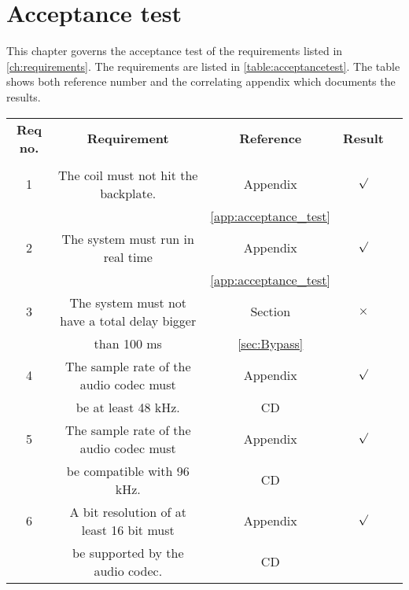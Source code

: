 \chapter{Acceptance test}

This chapter governs the acceptance test of the requirements listed in \autoref{ch:requirements}. The requirements are listed in \autoref{table:acceptancetest}. The table shows both reference number and the correlating appendix which documents the results.  

\renewcommand{\arraystretch}{0.95}
\begin{table}[H]
\centering
\begin{tabular}{|c|c|c|c|c|} \hline
\rowcolor{lightgray} \bfseries Req no. 	& \bfseries Requirement 						&  \bfseries Reference				&\bfseries Result 	\\ 
\rowcolor{lightgray}					&												&  									&		 			\\ \hline

1			& The coil must not hit the backplate. 			& Appendix 								&	$\surd$ 		\\ 
 			&												& \ref{app:acceptance_test}				&	 				\\ \hline
%
2			& The system must run in real time	 			& Appendix								& 	$\surd$			\\ 
			& 												& \ref{app:acceptance_test}				&					\\ \hline
%
3			& The system must not have a total delay bigger & Section								&  $\times$			\\ 
			& than 100 ms			 						& \ref{sec:Bypass}						&					\\ \hline
%
4			& The sample rate of the audio codec must   	& Appendix								& 	$\surd$			\\ 
			& be at least 48 kHz.							&	CD									&					\\ \hline

5			& The sample rate of the audio codec must   	& Appendix								& 	$\surd$			\\ 
			& be compatible with 96 kHz.					&	CD									&					\\ \hline
6			&  A bit resolution of at least 16 bit must 	& Appendix								&	$\surd$			\\ 
			&  be supported by the audio codec. 	 	 	&	CD					 				&					\\ \hline


\end{tabular}
\end{table}
